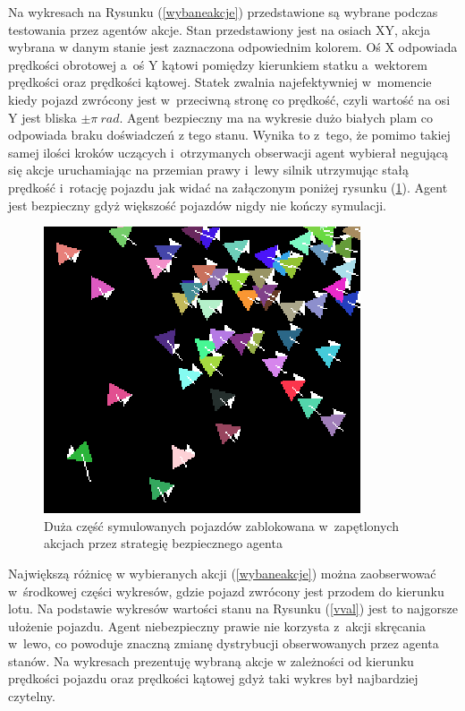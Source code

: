 \documentclass[12pt, oneside]{article}
\begin{document}
Na wykresach na Rysunku (\ref{wybaneakcje}) przedstawione są wybrane  podczas testowania przez agentów akcje. Stan przedstawiony jest na osiach XY, akcja wybrana w danym stanie jest zaznaczona odpowiednim kolorem. Oś X odpowiada prędkości obrotowej a~oś Y kątowi pomiędzy kierunkiem statku a~wektorem prędkości oraz prędkości kątowej. Statek zwalnia najefektywniej w~momencie kiedy pojazd zwrócony jest w~przeciwną stronę co prędkość, czyli wartość na osi Y jest bliska $\pm\pi~rad$. Agent bezpieczny ma na wykresie dużo białych plam co odpowiada braku doświadczeń z tego stanu. Wynika to z~tego, że pomimo takiej samej ilości kroków uczących i~otrzymanych obserwacji agent wybierał negującą się akcje uruchamiając na przemian prawy i~lewy silnik utrzymując stałą prędkość i~rotację pojazdu jak widać na załączonym poniżej rysunku (\ref{populacja}). Agent jest bezpieczny gdyż większość pojazdów nigdy nie kończy symulacji.
\begin{figure}[H]
\hfill\begin{minipage}{.5\textwidth}\centering
\includegraphics[width=0.7 \textwidth]{statki}
\caption{Duża część symulowanych pojazdów zablokowana w~zapętlonych akcjach przez strategię bezpiecznego agenta }
\label{populacja}
 \end{minipage}
\end{figure}
\pagebreak
Największą różnicę w wybieranych akcji (\ref{wybaneakcje}) można zaobserwować w~środkowej części wykresów, gdzie pojazd zwrócony jest przodem do kierunku lotu. Na podstawie wykresów wartości stanu na Rysunku (\ref{vval}) jest to najgorsze ułożenie pojazdu. Agent niebezpieczny prawie nie korzysta z~akcji skręcania w~lewo, co powoduje znaczną zmianę dystrybucji obserwowanych przez agenta stanów. Na wykresach prezentuję wybraną akcje w zależności od kierunku prędkości pojazdu oraz prędkości kątowej gdyż taki wykres był najbardziej czytelny. 
\end{document}

